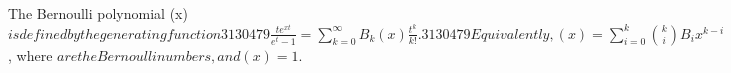 The  Bernoulli polynomial (x)$ is defined by the generating function
3130479\frac{te^{xt}}{e^t - 1} = \sum_{k=0}^{\infty} B_k(x) \frac{t^k}{k!}.3130479
Equivalently, (x) = \sum_{i=0}^{k} \binom{k}{i} B_i x^{k-i}$, where $ are the Bernoulli numbers, and (x) = 1$.
